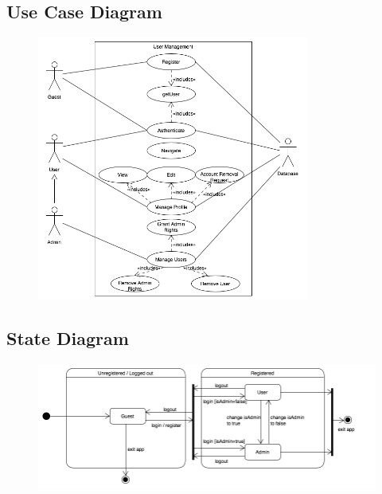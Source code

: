 \subsection{Use Case Diagram}
\begin{figure}[H]
	\includegraphics[width=0.8\textwidth]{User_Management/User_Management_Use_Case.png}
\end{figure}

\subsection{State Diagram}
\begin{figure}[H]
	\includegraphics[width=\textwidth]{User_Management/User_Management_State_Diagram.png}
\end{figure}

